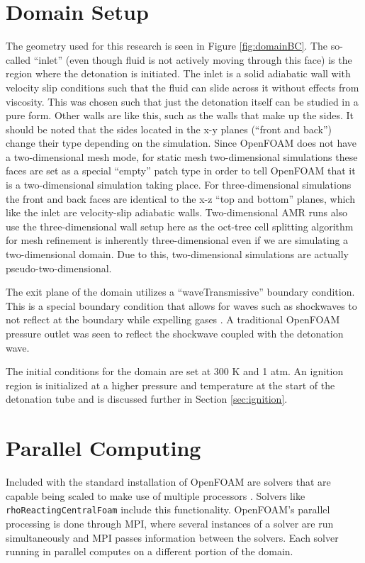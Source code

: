\section{Domain Setup}
The geometry used for this research is seen in Figure \ref{fig:domainBC}. The so-called ``inlet'' (even though fluid is not actively moving through this face) is the region where the detonation is initiated. The inlet is a solid adiabatic wall with velocity slip conditions such that the fluid can slide across it without effects from viscosity. This was chosen such that just the detonation itself can be studied in a pure form. Other walls are like this, such as the walls that make up the sides. It should be noted that the sides located in the x-y planes (``front and back'') change their type depending on the simulation. Since OpenFOAM does not have a two-dimensional mesh mode, for static mesh two-dimensional simulations these faces are set as a special ``empty'' patch type in order to tell OpenFOAM that it is a two-dimensional simulation taking place. For three-dimensional simulations the front and back faces are identical to the x-z ``top and bottom'' planes, which like the inlet are velocity-slip adiabatic walls. Two-dimensional AMR runs also use the three-dimensional wall setup here as the oct-tree cell splitting algorithm for mesh refinement is inherently three-dimensional even if we are simulating a two-dimensional domain. Due to this, two-dimensional simulations are actually pseudo-two-dimensional. 

The exit plane of the domain utilizes a ``waveTransmissive'' boundary condition. This is a special boundary condition that allows for waves such as shockwaves to not reflect at the boundary while expelling gases \cite{poinsot}. A traditional OpenFOAM pressure outlet was seen to reflect the shockwave coupled with the detonation wave. 

The initial conditions for the domain are set at 300 K and 1 atm. An ignition region is initialized at a higher pressure and temperature at the start of the detonation tube and is discussed further in Section \ref{sec:ignition}.




\section{Parallel Computing}
Included with the standard installation of OpenFOAM are solvers that are capable being scaled to make use of multiple processors \cite{ofug}. Solvers like \verb|rhoReactingCentralFoam| include this functionality. OpenFOAM's parallel processing is done through MPI, where several instances of a solver are run simultaneously and MPI passes information between the solvers. Each solver running in parallel computes on a different portion of the domain. 

